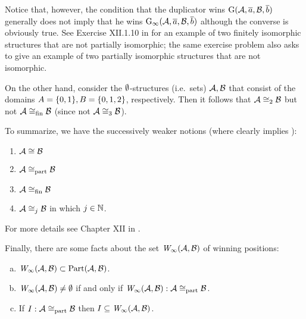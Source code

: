 \begin{enumerate}[1.]
Notice that, however, the condition that the duplicator wins $\mathrm{G}(\mathcal{A}, \overline{a}, \mathcal{B}, \overline{b})$ generally does not imply that he wins $\game{\infty}(\strct{A}, \vect{a}, \strct{B}, \vect{b})$ although the converse is obviously true. See Exercise XII.1.10 in \cite{EFT} for an example of two finitely isomorphic structures that are not partially isomorphic; the same exercise problem also asks to give an example of two partially isomorphic structures that are not isomorphic.

On the other hand, consider the $\emptyset$-structures (i.e.\ sets) $\mathcal{A}, \mathcal{B}$ that consist of the domains $A = {\{0, 1\}}, B = {\{0, 1, 2\}}$, respectively. Then it follows that $\mathcal{A} \cong_2 \mathcal{B}$ but not $\mathcal{A} \cong_{\mathrm{fin}} \mathcal{B}$ (since not $\mathcal{A} \cong_3 \mathcal{B}$).

To summarize, we have the successively weaker notions (where  clearly implies ):
\begin{enumerate}[(1)]
\item $\mathcal{A} \cong \mathcal{B}$
\item $\mathcal{A} \cong_{\mathrm{part}} \mathcal{B}$
\item $\mathcal{A} \cong_{\mathrm{fin}} \mathcal{B}$
\item $\mathcal{A} \cong_j \mathcal{B}$ in which $j \in \mathbb{N}$.
\end{enumerate}

\begin{remark}
For more details see Chapter XII in \cite{EFT}.
\end{remark}

Finally, there are some facts about the set $\winpos{\infty}(\strct{A}, \strct{B})$ of winning positions: \begin{enumerate}[(a)]
\item $\winpos{\infty}(\strct{A}, \strct{B}) \subset \partisoms(\strct{A}, \strct{B})$.
\item $\winpos{\infty}(\strct{A}, \strct{B}) \neq \emptyset$ if and only if $\winpos{\infty}(\strct{A}, \strct{B}): \strct{A} \isom_\partially \strct{B}$.
\item If $I: \mathcal{A} \cong_{\mathrm{part}} \mathcal{B}$ then $I \subseteq \winpos{\infty}(\strct{A}, \strct{B})$.
\end{enumerate}


\end{enumerate}
